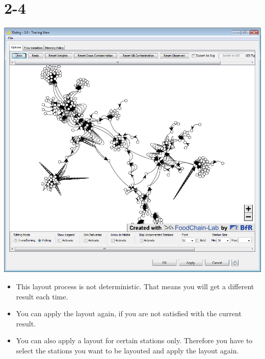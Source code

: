 \documentclass[10pt]{beamer}
\begin{document}
\section{2-4}
\begin{frame}
	\begin{center}
  		\includegraphics[height=0.55\textheight]{2-4.png}
	\end{center}
	\begin{itemize}
		\item This layout process is not deterministic. That means you will get a different result each time.
		\item You can apply the layout again, if you are not satisfied with the current result.
		\item You can also apply a layout for certain stations only. Therefore you have to select the stations you want to be layouted and apply the layout again.
	\end{itemize}
\end{frame}
\end{document}
